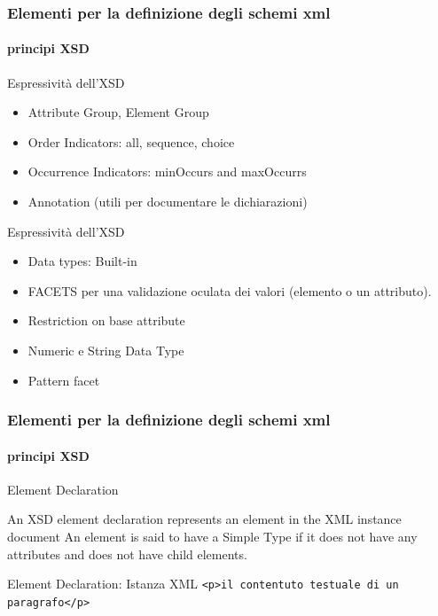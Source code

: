 \begin{frame}
	\frametitle{Elementi per la definizione degli schemi xml}
	\framesubtitle{principi XSD}
	\addtocounter{nframe}{1}

	\begin{block}{Espressività dell'XSD}

		\begin{itemize}
			\item Attribute Group, Element Group
			\item Order Indicators: all, sequence, choice
			\item Occurrence Indicators: minOccurs and maxOccurrs
			\item Annotation (utili per documentare le dichiarazioni)
		\end{itemize}

	\end{block}

	\begin{block}{Espressività dell'XSD}
		\begin{itemize}
			\item Data types: Built-in
			\item FACETS per una validazione oculata dei valori (elemento o un attributo).
			\item Restriction on base attribute
			\item Numeric e String Data Type
			\item Pattern facet
		\end{itemize}

	\end{block}

\end{frame}


\begin{frame}
	\frametitle{Elementi per la definizione degli schemi xml}
	\framesubtitle{principi XSD}
	\addtocounter{nframe}{1}

	\begin{block}{Element Declaration}

		An XSD element declaration represents an element in the XML instance document
		An element is said to have a Simple Type if it does not have any attributes and does not have child elements.
	\end{block}

	\begin{block}{Element Declaration: Istanza XML }
		\texttt{<p>il contentuto testuale di un paragrafo</p>}
	\end{block}

\end{frame}


